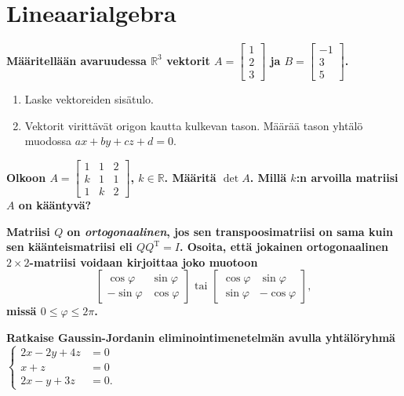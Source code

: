 \documentclass[12pt,finnish]{exam}
\begin{document}
 \section*{Lineaarialgebra}
 
\vspace{5mm}
 
\begin{questions}
\bfseries
\question
\mdseries
Määritellään avaruudessa \(\mathbb{R}^3\) vektorit \(A=\begin{bmatrix}
       1         \\
       2         \\
       3
     \end{bmatrix}\)
     ja \(B=\begin{bmatrix}
       -1         \\
       3         \\
       5
     \end{bmatrix}\).

\begin{enumerate}[label=\textbf{\alph*)}]
\item Laske vektoreiden sisätulo.
\item Vektorit virittävät origon kautta kulkevan tason. Määrää tason yhtälö muodossa \(ax+by+cz+d=0\).
\end{enumerate}

\bfseries
\question
\mdseries
Olkoon \(A=\begin{bmatrix}
       1&1&2         \\
       k&1&1         \\
       1&k&2
     \end{bmatrix}\), \(k\in \mathbb{R}\). Määritä \(\det A\). Millä \(k\):n arvoilla matriisi \(A\) on kääntyvä?

\bfseries
\question
\mdseries  
Matriisi \(Q\) on \emph{ortogonaalinen}, jos sen transpoosimatriisi on sama kuin sen käänteismatriisi eli \(QQ^{\text{T}}=I\). Osoita, että jokainen ortogonaalinen \(2\times 2\)-matriisi voidaan kirjoittaa joko muotoon $$\begin{bmatrix} \cos \varphi & \sin \varphi \\ -\sin \varphi & \cos \varphi \end{bmatrix} \text{ tai } \begin{bmatrix} \cos \varphi & \sin \varphi \\ \sin \varphi & -\cos \varphi \end{bmatrix},$$ missä \(0\leq \varphi \leq 2\pi\).

\bfseries
\question
\mdseries
Ratkaise Gaussin-Jordanin eliminointimenetelmän avulla yhtälöryhmä \(\begin{cases} 2x-2y+4z&=0 \\ x+z&=0 \\ 2x-y+3z&=0. \end{cases}\)
\end{questions}
\thispagestyle{empty}
\end{document}
